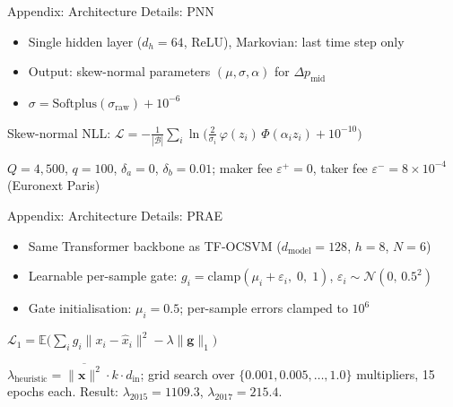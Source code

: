 \documentclass{beamer}
\begin{document}
\begin{frame}{Appendix: Architecture Details: PNN}
    \begin{tcolorbox}[keybox, title=Architecture]
        \begin{itemize}
            \item Single hidden layer ($d_h{=}64$, ReLU), Markovian: last time step only
            \item Output: skew-normal parameters $(\mu, \sigma, \alpha)$ for $\Delta p_{\text{mid}}$
            \item $\sigma = \mathrm{Softplus}(\sigma_{\text{raw}}) + 10^{-6}$
        \end{itemize}
    \end{tcolorbox}
    \begin{tcolorbox}[keybox, title=Training Objective]
        Skew-normal NLL: $\mathcal{L} = -\frac{1}{|\mathcal{B}|}\sum_i \ln\bigl(\frac{2}{\sigma_i}\,\varphi(z_i)\,\Phi(\alpha_i z_i) + 10^{-10}\bigr)$
    \end{tcolorbox}
    \begin{tcolorbox}[keybox, title=Spoofing Gain Parameters]
        $Q{=}4{,}500$, $q{=}100$, $\delta_a{=}0$, $\delta_b{=}0.01$; maker fee $\varepsilon^+{=}0$, taker fee $\varepsilon^-{=}8 \times 10^{-4}$ (Euronext Paris)
    \end{tcolorbox}
\end{frame}

\begin{frame}{Appendix: Architecture Details: PRAE}
    \begin{tcolorbox}[keybox, title=Architecture]
        \begin{itemize}
            \item Same Transformer backbone as TF-OCSVM ($d_{\text{model}}{=}128$, $h{=}8$, $N{=}6$)
            \item Learnable per-sample gate: $g_i = \mathrm{clamp}(\mu_i + \varepsilon_i,\; 0,\; 1)$, \quad $\varepsilon_i \sim \mathcal{N}(0,\, 0.5^2)$
            \item Gate initialisation: $\mu_i = 0.5$; per-sample errors clamped to $10^6$
        \end{itemize}
    \end{tcolorbox}
    \begin{tcolorbox}[keybox, title=Training Objective]
        $\mathcal{L}_1 = \mathbb{E}\bigl(\sum_i g_i \|x_i - \hat{x}_i\|^2 - \lambda \|\mathbf{g}\|_1\bigr)$
    \end{tcolorbox}
    \begin{tcolorbox}[keybox, title=$\lambda$ Tuning (Day~1)]
        $\lambda_{\text{heuristic}} = \overline{\|\mathbf{x}\|^2} \cdot k \cdot d_{\text{in}}$; grid search over $\{0.001, 0.005, \ldots, 1.0\}$ multipliers, 15 epochs each. Result: $\lambda_{2015} = 1109.3$, $\lambda_{2017} = 215.4$.
    \end{tcolorbox}
\end{frame}
\end{document}
